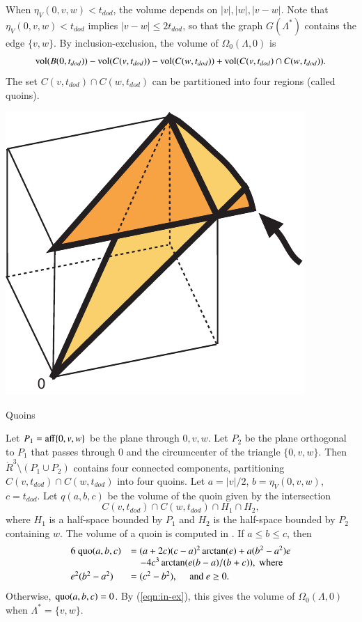 \documentclass{article} %
\begin{document}
When $\eta_V(0,v,w) < t_{dod}$, the volume depends on
$|v|,|w|,|v-w|$.  Note that $\eta_V(0,v,w) < t_{dod}$ implies
$|v-w|\le 2t_{dod}$, so that the graph $G(\Lambda^*)$ contains
the edge $\{v,w\}$.
By inclusion-exclusion, the volume of $\Omega_0(\Lambda,0)$ is
\begin{equation}\label{eqn:in-ex}
  {\operatorname{vol}}(B(0,t_{dod})) - {\operatorname{vol}}(C(v,t_{dod})) - {\operatorname{vol}}(C(w,t_{dod})) +
  {\operatorname{vol}}(C(v,t_{dod}) \cap C(w,t_{dod})).
\end{equation}
The set $C(v,t_{dod})\cap C(w,t_{dod})$ can be partitioned into four
regions (called quoins). 

\begin{Figure}
  \begin{center}
    \includegraphics[scale=0.50]{images/quoin.pdf}
  \end{center}
  \caption{Quoins}
  \label{fig:quoin}
 \end{Figure}

Let $P_1={\operatorname{aff}}\{0,v,w\}$ be the plane through $0,v,w$. Let
$P_2$ be the plane orthogonal to $P_1$ that passes through $0$ and the
circumcenter of the triangle $\{0,v,w\}$. Then $\ring{R}^3\setminus
(P_1\cup P_2)$ contains four connected components, partitioning
$C(v,t_{dod})\cap C(w,t_{dod})$ into four quoins. Let $a=|v|/2$,
$b=\eta_V(0,v,w)$, $c=t_{dod}$. Let $q(a,b,c)$ be the volume of the
quoin given by the intersection
$$C(v,t_{dod})\cap C(w,t_{dod}) \cap H_1 \cap H_2,$$
where $H_1$ is a half-space bounded by $P_1$ and $H_2$ is
the half-space bounded by $P_2$ containing $w$.
The volume of a quoin is computed in \cite[\S7.3]{Hales:2006:DCG}.
If $a\le b\le c$, then 
\begin{equation}
\begin{array}{lll}
6\ {\operatorname{quo}}(a,b,c) &= (a+2c) (c-a)^2 \arctan(e) + a(b^2-a^2) e \\
&\quad - 4c^3 \arctan(e(b-a)/(b+c)),\text{ where}\\ [0.5ex]
e^2 (b^2-a^2)&= (c^2 - b^2), \quad \text{ and } e\ge 0.
\end{array}
\end{equation}
Otherwise, ${\operatorname{quo}}(a,b,c) = 0$.  By (\ref{eqn:in-ex}), this gives
the volume of $\Omega_0(\Lambda,0)$ when $\Lambda^*=\{v,w\}$.
\end{document}
